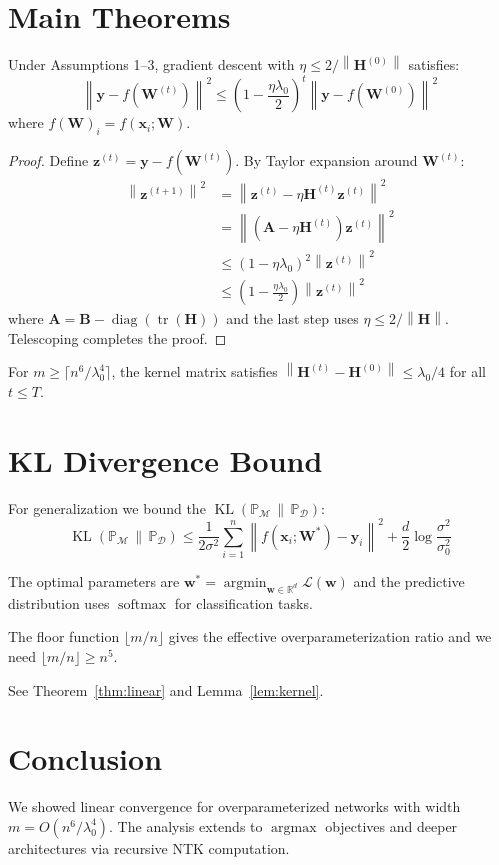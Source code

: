\documentclass{article}
\newcommand{\vx}{\mathbf{x}}
\newcommand{\vy}{\mathbf{y}}
\newcommand{\vz}{\mathbf{z}}
\newcommand{\vw}{\mathbf{w}}
\newcommand{\mA}{\mathbf{A}}
\newcommand{\mB}{\mathbf{B}}
\newcommand{\mW}{\mathbf{W}}
\newcommand{\mH}{\mathbf{H}}
\newcommand{\real}{\mathbb{R}}
\newcommand{\prob}{\mathbb{P}}
\newcommand{\loss}{\mathcal{L}}
\newcommand{\dataset}{\mathcal{D}}
\newcommand{\model}{\mathcal{M}}
\newcommand{\norm}[1]{\left\|#1\right\|}
\newcommand{\ceil}[1]{\lceil #1 \rceil}
\newcommand{\floor}[1]{\lfloor #1 \rfloor}
\newcommand{\argmin}{\operatorname{argmin}}
\newcommand{\argmax}{\operatorname{argmax}}
\newcommand{\softmax}{\operatorname{softmax}}
\newcommand{\tr}{\operatorname{tr}}
\newcommand{\diag}{\operatorname{diag}}
\DeclareMathOperator{\KL}{KL}
\newcommand{\dkl}[2]{\KL\left(#1 \,\|\, #2\right)}
\begin{document}
\section{Main Theorems}

\begin{theorem}
\label{thm:linear}
Under Assumptions 1--3, gradient descent with $\eta \leq 2 / \norm{\mH^{(0)}}$ satisfies:
\[
\norm{\vy - f(\mW^{(t)})}^2 \leq \left(1 - \frac{\eta \lambda_0}{2}\right)^t \norm{\vy - f(\mW^{(0)})}^2
\]
where $f(\mW)_i = f(\vx_i; \mW)$.
\end{theorem}

\begin{proof}
Define $\vz^{(t)} = \vy - f(\mW^{(t)})$.  By Taylor expansion around $\mW^{(t)}$:
\begin{align}
\norm{\vz^{(t+1)}}^2
&= \norm{\vz^{(t)} - \eta \mH^{(t)} \vz^{(t)}}^2 \\
&= \norm{(\mA - \eta \mH^{(t)}) \vz^{(t)}}^2 \\
&\leq \left(1 - \eta \lambda_0\right)^2 \norm{\vz^{(t)}}^2 \\
&\leq \left(1 - \frac{\eta \lambda_0}{2}\right) \norm{\vz^{(t)}}^2
\end{align}
where $\mA = \mB - \diag(\tr(\mH))$ and the last step uses $\eta \leq 2/\norm{\mH}$.
Telescoping completes the proof.
\end{proof}

\begin{lemma}
\label{lem:kernel}
For $m \geq \ceil{n^6 / \lambda_0^4}$, the kernel matrix satisfies
$\norm{\mH^{(t)} - \mH^{(0)}} \leq \lambda_0 / 4$ for all $t \leq T$.
\end{lemma}

\section{KL Divergence Bound}

For generalization we bound the $\dkl{\prob_{\model}}{\prob_{\dataset}}$:
\[
\dkl{\prob_{\model}}{\prob_{\dataset}}
\leq \frac{1}{2\sigma^2} \sum_{i=1}^n \norm{f(\vx_i; \mW^*) - \vy_i}^2 + \frac{d}{2} \log\frac{\sigma^2}{\sigma_0^2}
\]

The optimal parameters are $\vw^* = \argmin_{\vw \in \real^d} \loss(\vw)$
and the predictive distribution uses $\softmax$ for classification tasks.

The floor function $\floor{m / n}$ gives the effective overparameterization
ratio and we need $\floor{m/n} \geq n^5$.

See Theorem~\ref{thm:linear} and Lemma~\ref{lem:kernel}.

\section{Conclusion}

We showed linear convergence for overparameterized networks with
width $m = O(n^6 / \lambda_0^4)$.  The analysis extends to $\argmax$
objectives and deeper architectures via recursive NTK computation.
\end{document}
